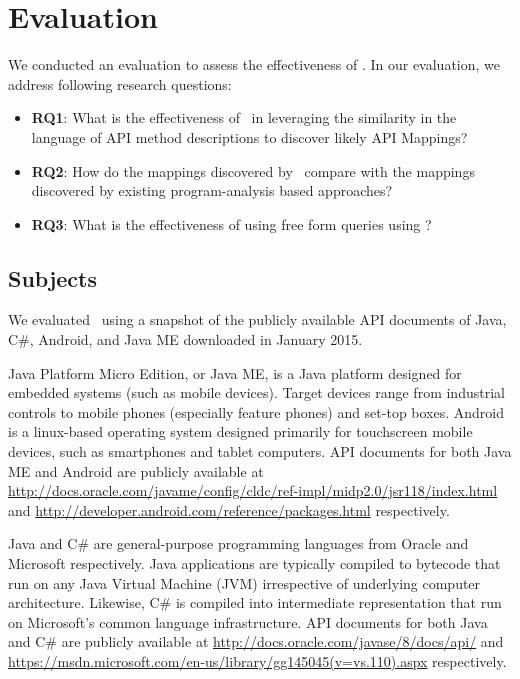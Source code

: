 \section{Evaluation}
\label{sec:evaluation}

We conducted an evaluation to assess the effectiveness of \tool. In our evaluation, we address following research questions:

\begin{itemize}
	
\item\textbf{RQ1}: What is the effectiveness of \tool\ in leveraging the similarity in the language of API method descriptions to discover likely API Mappings?

\item\textbf{RQ2}: How do the mappings discovered by \tool\ compare with the mappings discovered by existing program-analysis based approaches?

\item\textbf{RQ3}: What is the effectiveness of using free form queries using \tool?

\end{itemize}

\subsection{Subjects}
\label{sub:subject}


We evaluated \tool\ using a snapshot of the publicly available API documents of Java, C\#, Android, and Java ME downloaded in January 2015. 

Java Platform Micro Edition, or Java ME, is a Java platform designed for embedded systems (such as mobile devices). Target devices range from industrial controls to mobile phones (especially feature phones) and set-top boxes.
Android is a linux-based operating system designed primarily for touchscreen mobile devices, such as smartphones and tablet computers.
API documents for both Java ME and Android are publicly available at
\url{http://docs.oracle.com/javame/config/cldc/ref-impl/midp2.0/jsr118/index.html}
and 
\url{http://developer.android.com/reference/packages.html}
respectively.

Java and C\# are general-purpose programming languages from Oracle and Microsoft respectively. Java applications are typically compiled to bytecode that run on any Java Virtual Machine (JVM) irrespective of underlying computer architecture.
Likewise, C\# is compiled into intermediate representation that run on Microsoft's common language infrastructure.
API documents for both Java and C\# are publicly available at
\url{http://docs.oracle.com/javase/8/docs/api/}
and
\url{https://msdn.microsoft.com/en-us/library/gg145045(v=vs.110).aspx}
respectively.



